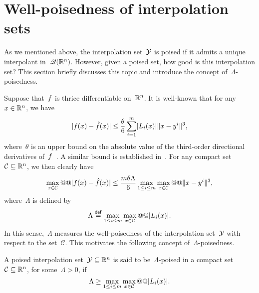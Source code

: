\section{Well-poisedness of interpolation sets}
\label{sec:poisedness}

As we mentioned above, the interpolation set~$\xpt$ is poised if it admits a unique interpolant in~$\mathscr{Q}(\mathbb{R}^n)$.
However, given a poised set, how good is this interpolation set?
This section briefly discusses this topic and introduce the concept of~$\Lambda$-poisedness.

Suppose that~$f$ is thrice differentiable on~$\mathbb{R}^n$.
It is well-known that for any~$\iter \in \R^n$, we have
\begin{equation}
    \label{eq:Ciarlet_Raviart_0}
    \abs{\obj(\iter) - \objm(\iter)} \le \frac{\theta}{6} \sum_{i = 1}^m \abs{\lagp[i](\iter)} \norm{x - y^i}^3,
\end{equation}
where~$\theta$ is an upper bound on the absolute value of the third-order directional derivatives of~$f$~\cite[Thm.~2]{Powell_2001}.
A similar bound is established in~\cite[Thm.~2]{Ciarlet_Raviart_1972}.
For any compact set~$\mathcal{C} \subseteq \mathbb{R}^n$, we then clearly have
\begin{equation}
    \label{eq:ciarlet-raviard-bound}
    \max_{\iter \in \mathcal{C}} @@ \abs{\obj(\iter) - \objm(\iter)} \le \frac{m \theta \Lambda}{6} \max_{1 \le i \le m} \max_{\iter \in \mathcal{C}} @@ \norm{x - y^i}^3,
\end{equation}
where~$\Lambda$ is defined by
\begin{equation}
    \label{eq:lambda-poisedness-convex-hull}
    \Lambda \eqdef \max_{1 \le i \le m} \max_{\iter \in \mathcal{C}} @@ \abs{\lagp[i](\iter)}.
\end{equation}
In this sense,~$\Lambda$ measures the well-poisedness of the interpolation set~$\xpt$ with respect to the set~$\mathcal{C}$.
This motivates the following concept of~$\Lambda$-poisedness.

\begin{definition}
    \label{def:lambda-poisedness}
    A poised interpolation set~$\xpt \subseteq \R^n$ is said to be~$\Lambda$-poised in a compact set~$\mathcal{C} \subseteq \mathbb{R}^n$, for some~$\Lambda > 0$, if
    \begin{equation*}
        \Lambda \ge \max_{1 \le i \le m} \max_{\iter \in \mathcal{C}} @@ \abs{\lagp[i](\iter)}.
    \end{equation*}
\end{definition}

